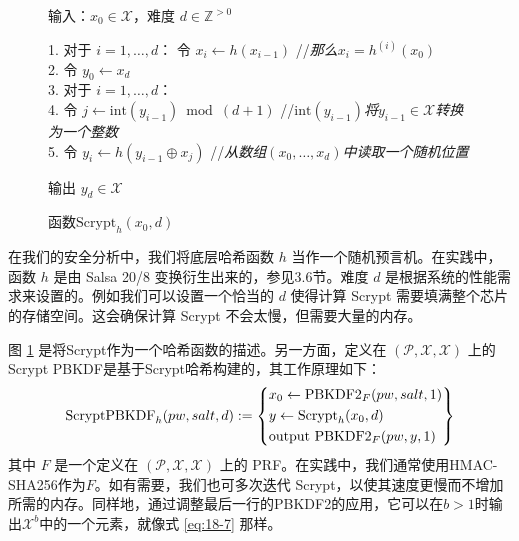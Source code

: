 \begin{figure}
    \hspace*{5pt} 输入：$x_0\in\mathcal{X}$，难度 $d\in\mathbb{Z}^{>0}$

	\vspace{3pt}

	\hspace*{5pt} 1.
	\hspace*{20pt} 对于 $i=1,\dots,d$： 令 $x_i\leftarrow h(x_{i-1})$
	\hspace*{20pt} //\quad\emph{那么}$x_i=h^{(i)}(x_0)$\\
	\hspace*{5pt} 2.
	\hspace*{20pt} 令 $y_0\leftarrow x_d$\\
	\hspace*{5pt} 3.
	\hspace*{20pt} 对于 $i=1,\dots,d$：\\
	\hspace*{5pt} 4.
	\hspace*{50pt} 令 $j\leftarrow\mathrm{int}(y_{i-1})\bmod(d+1)$
	\hspace*{16pt} //\quad$\mathrm{int}(y_{i-1})$\emph{将}$y_{i-1}\in\mathcal{X}$\emph{转换为一个整数}\\
	\hspace*{5pt} 5.
	\hspace*{50pt} 令 $y_i\leftarrow h(y_{i-1}\oplus x_j)$
	\hspace*{52pt} //\quad\emph{从数组}$(x_0,\dots,x_d)$\emph{中读取一个随机位置}
	
	\vspace{3pt}
	
	\hspace*{5pt} 输出 $y_d\in\mathcal{X}$
	\caption{函数$\mathrm{Scrypt}_h(x_0,d)$}
  \label{fig:18-6}
\end{figure}

在我们的安全分析中，我们将底层哈希函数 $h$ 当作一个随机预言机。在实践中，函数 $h$ 是由 Salsa 20/8 变换衍生出来的，参见3.6节。难度 $d$ 是根据系统的性能需求来设置的。例如我们可以设置一个恰当的 $d$ 使得计算 Scrypt 需要填满整个芯片的存储空间。这会确保计算 Scrypt 不会太慢，但需要大量的内存。

图 \ref{fig:18-6} 是将Scrypt作为一个哈希函数的描述。另一方面，定义在 $(\mathcal{P},\mathcal{X},\mathcal{X})$ 上的Scrypt PBKDF是基于Scrypt哈希构建的，其工作原理如下：
\begin{equation}\label{eq:18-8}
	{\rm ScryptPBKDF}_h(pw,salt,d):=
	\left\{
	\begin{aligned}
		& x_0\leftarrow {\rm PBKDF2}_F(pw,salt,1)\\
		& y\leftarrow \text{Scrypt}_h(x_0,d)\\
		& \text{output }{\rm PBKDF2}_F(pw,y,1)
	\end{aligned}
	\right\}
\end{equation}
其中 $F$ 是一个定义在 $(\mathcal{P},\mathcal{X},\mathcal{X})$ 上的 PRF。在实践中，我们通常使用HMAC-SHA256作为$F$。如有需要，我们也可多次迭代 Scrypt，以使其速度更慢而不增加所需的内存。同样地，通过调整最后一行的PBKDF2的应用，它可以在$b>1$时输出$\mathcal{X}^b$中的一个元素，就像式 \ref{eq:18-7} 那样。

